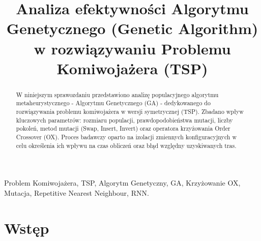 \documentclass[conference]{IEEEtran}
\begin{document}
    
    \title{Analiza efektywności Algorytmu Genetycznego (Genetic Algorithm) w rozwiązywaniu Problemu Komiwojażera (TSP)}
    \author{
        }
    \maketitle
    \thispagestyle{empty}
    \pagestyle{plain}


    \begin{abstract}
    W niniejszym sprawozdaniu przedstawiono analizę populacyjnego algorytmu metaheurystycznego - Algorytmu Genetycznego (GA) - dedykowanego do rozwiązywania problemu komiwojażera w wersji symetrycznej (TSP). Zbadano wpływ kluczowych parametrów: rozmiaru populacji, prawdopodobieństwa mutacji, liczby pokoleń, metod mutacji (Swap, Insert, Invert) oraz operatora krzyżowania Order Crossover (OX). Proces badawczy oparto na izolacji zmiennych konfiguracyjnych w celu określenia ich wpływu na czas obliczeń oraz błąd względny uzyskiwanych tras.
    \end{abstract}
    
    \begin{IEEEkeywords}
    Problem Komiwojażera, TSP, Algorytm Genetyczny, GA, Krzyżowanie OX, Mutacja, Repetitive Nearest Neighbour, RNN.
    \end{IEEEkeywords}


    \section{Wstęp}
\end{document}
